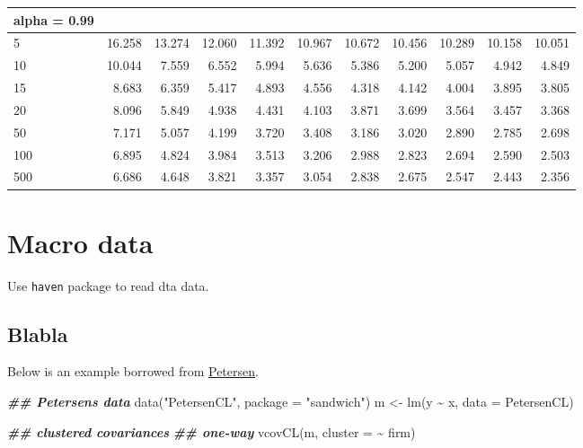 \documentclass[
]{book}
\newenvironment{Shaded}{\begin{snugshade}}{\end{snugshade}}
\newcommand{\AttributeTok}[1]{\textcolor[rgb]{0.77,0.63,0.00}{#1}}
\newcommand{\DocumentationTok}[1]{\textcolor[rgb]{0.56,0.35,0.01}{\textbf{\textit{#1}}}}
\newcommand{\FunctionTok}[1]{\textcolor[rgb]{0.00,0.00,0.00}{#1}}
\newcommand{\NormalTok}[1]{#1}
\newcommand{\OtherTok}[1]{\textcolor[rgb]{0.56,0.35,0.01}{#1}}
\newcommand{\SpecialCharTok}[1]{\textcolor[rgb]{0.00,0.00,0.00}{#1}}
\newcommand{\StringTok}[1]{\textcolor[rgb]{0.31,0.60,0.02}{#1}}
\theoremstyle{definition}
\theoremstyle{definition}
\theoremstyle{definition}
\theoremstyle{definition}
\theoremstyle{remark}
\begin{document}
\begin{table}
\begin{tabular}[t]{l|r|r|r|r|r|r|r|r|r|r}
\hline
alpha = 0.99 &  &  &  &  &  &  &  &  &  & \\
\hline
5 & 16.258 & 13.274 & 12.060 & 11.392 & 10.967 & 10.672 & 10.456 & 10.289 & 10.158 & 10.051\\
\hline
10 & 10.044 & 7.559 & 6.552 & 5.994 & 5.636 & 5.386 & 5.200 & 5.057 & 4.942 & 4.849\\
\hline
15 & 8.683 & 6.359 & 5.417 & 4.893 & 4.556 & 4.318 & 4.142 & 4.004 & 3.895 & 3.805\\
\hline
20 & 8.096 & 5.849 & 4.938 & 4.431 & 4.103 & 3.871 & 3.699 & 3.564 & 3.457 & 3.368\\
\hline
50 & 7.171 & 5.057 & 4.199 & 3.720 & 3.408 & 3.186 & 3.020 & 2.890 & 2.785 & 2.698\\
\hline
100 & 6.895 & 4.824 & 3.984 & 3.513 & 3.206 & 2.988 & 2.823 & 2.694 & 2.590 & 2.503\\
\hline
500 & 6.686 & 4.648 & 3.821 & 3.357 & 3.054 & 2.838 & 2.675 & 2.547 & 2.443 & 2.356\\
\hline
\end{tabular}
\end{table}

\hypertarget{macro-data}{%
\chapter{Macro data}\label{macro-data}}

Use \texttt{haven} package to read dta data.

\hypertarget{blabla}{%
\section{Blabla}\label{blabla}}

Below is an example borrowed from \href{https://www.kellogg.northwestern.edu/faculty/petersen/htm/papers/se/test_data.htm}{Petersen}.

\begin{Shaded}
\begin{Highlighting}[]
\DocumentationTok{\#\# Petersen\textquotesingle{}s data}
\FunctionTok{data}\NormalTok{(}\StringTok{"PetersenCL"}\NormalTok{, }\AttributeTok{package =} \StringTok{"sandwich"}\NormalTok{)}
\NormalTok{m }\OtherTok{\textless{}{-}} \FunctionTok{lm}\NormalTok{(y }\SpecialCharTok{\textasciitilde{}}\NormalTok{ x, }\AttributeTok{data =}\NormalTok{ PetersenCL)}

\DocumentationTok{\#\# clustered covariances}
\DocumentationTok{\#\# one{-}way}
\FunctionTok{vcovCL}\NormalTok{(m, }\AttributeTok{cluster =} \SpecialCharTok{\textasciitilde{}}\NormalTok{ firm)}
\end{Highlighting}
\end{Shaded}
\end{document}
